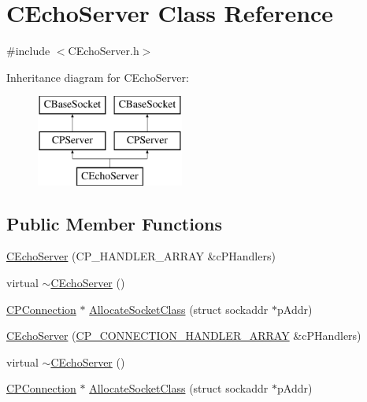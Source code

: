 \hypertarget{class_c_echo_server}{\section{\-C\-Echo\-Server \-Class \-Reference}
\label{class_c_echo_server}
}


{\ttfamily \#include $<$\-C\-Echo\-Server.\-h$>$}

\-Inheritance diagram for \-C\-Echo\-Server\-:\begin{figure}[H]
\begin{center}
\leavevmode
\includegraphics[height=3.000000cm]{class_c_echo_server}
\end{center}
\end{figure}
\subsection*{\-Public \-Member \-Functions}
\begin{DoxyCompactItemize}
\item 
\hyperlink{class_c_echo_server_a36cb9f59f793eef9a95b3d442d64ced4}{\-C\-Echo\-Server} (\-C\-P\-\_\-\-H\-A\-N\-D\-L\-E\-R\-\_\-\-A\-R\-R\-A\-Y \&c\-P\-Handlers)
\item 
virtual \hyperlink{class_c_echo_server_a2aab2a9ad38a750fb834392ba245f493}{$\sim$\-C\-Echo\-Server} ()
\item 
\hyperlink{class_c_p_connection}{\-C\-P\-Connection} $\ast$ \hyperlink{class_c_echo_server_a538eb049166aca7a0d27c7914c853876}{\-Allocate\-Socket\-Class} (struct sockaddr $\ast$p\-Addr)
\item 
\hyperlink{class_c_echo_server_a6bea4b7b0b87f08dc82e01537fc0000d}{\-C\-Echo\-Server} (\hyperlink{_c_p_connection_handler_8h_a05bf2fef946dbf14350a5f45bb28f953}{\-C\-P\-\_\-\-C\-O\-N\-N\-E\-C\-T\-I\-O\-N\-\_\-\-H\-A\-N\-D\-L\-E\-R\-\_\-\-A\-R\-R\-A\-Y} \&c\-P\-Handlers)
\item 
virtual \hyperlink{class_c_echo_server_a29b2422e3ec5976d2f4749db4e30cbad}{$\sim$\-C\-Echo\-Server} ()
\item 
\hyperlink{class_c_p_connection}{\-C\-P\-Connection} $\ast$ \hyperlink{class_c_echo_server_a8db4489876af267711eefbfd891bbb4d}{\-Allocate\-Socket\-Class} (struct sockaddr $\ast$p\-Addr)
\end{DoxyCompactItemize}


